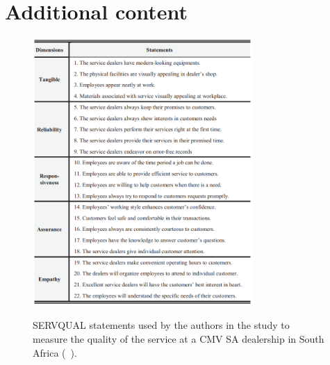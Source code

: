 \chapter{Additional content}


\begin{figure}[h]
    \caption{SERVQUAL statements used by the authors in the study to measure the quality of the service at a CMV SA dealership in South Africa (~\cite{Measuring_After_sales_Service_Quality}).}
    \centering
    \includegraphics[width=0.75\textwidth]{figs/SERVQUAL_statements}
    \label{fig:SERVQUAL_statements}
  \end{figure}


